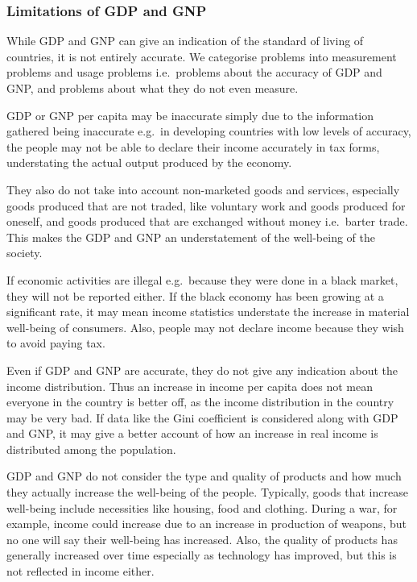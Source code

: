 \documentclass[Economics.tex]{subfiles}
\begin{document}
\subsubsection{Limitations of GDP and GNP}
While GDP and GNP can give an indication of the standard of living of countries, it is not entirely accurate. We categorise problems into measurement problems and usage problems i.e.\ problems about the accuracy of GDP and GNP, and problems about what they do not even measure.

GDP or GNP per capita may be inaccurate simply due to the information gathered being inaccurate e.g.\ in developing countries with low levels of accuracy, the people may not be able to declare their income accurately in tax forms, understating the actual output produced by the economy.

They also do not take into account non-marketed goods and services, especially goods produced that are not traded, like voluntary work and goods produced for oneself, and goods produced that are exchanged without money i.e.\ barter trade. This makes the GDP and GNP an understatement of the well-being of the society.

If economic activities are illegal e.g.\ because they were done in a black market, they will not be reported either. If the black economy has been growing at a significant rate, it may mean income statistics understate the increase in material well-being of consumers. Also, people may not declare income because they wish to avoid paying tax.

Even if GDP and GNP are accurate, they do not give any indication about the income distribution. Thus an increase in income per capita does not mean everyone in the country is better off, as the income distribution in the country may be very bad. If data like the Gini coefficient is considered along with GDP and GNP, it may give a better account of how an increase in real income is distributed among the population.

GDP and GNP do not consider the type and quality of products and how much they actually increase the well-being of the people. Typically, goods that increase well-being include necessities like housing, food and clothing. During a war, for example, income could increase due to an increase in production of weapons, but no one will say their well-being has increased. Also, the quality of products has generally increased over time especially as technology has improved, but this is not reflected in income either.
\end{document}

